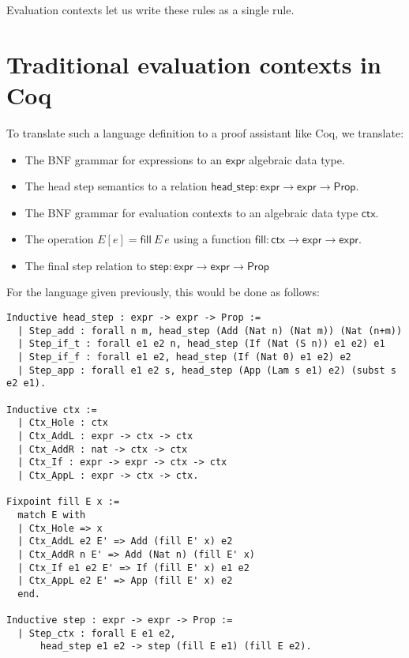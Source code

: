 \documentclass[a4paper, 11pt]{article}
\begin{document}
Evaluation contexts let us write these rules as a single rule.

\section{Traditional evaluation contexts in Coq}

To translate such a language definition to a proof assistant like Coq, we translate:

\begin{itemize}
  \item The BNF grammar for expressions to an $\mathsf{expr}$ algebraic data type.
  \item The head step semantics to a relation $\mathsf{head\_step} : \mathsf{expr} \to \mathsf{expr} \to \mathsf{Prop}$.
  \item The BNF grammar for evaluation contexts to an algebraic data type $\mathsf{ctx}$.
  \item The operation $E[e] = \mathsf{fill}\ E\ e$ using a function $\mathsf{fill} : \mathsf{ctx} \to \mathsf{expr} \to \mathsf{expr}$.
  \item The final step relation to $\mathsf{step} : \mathsf{expr} \to \mathsf{expr} \to \mathsf{Prop}$
\end{itemize}

For the language given previously, this would be done as follows:

\begin{lstlisting}
Inductive head_step : expr -> expr -> Prop :=
  | Step_add : forall n m, head_step (Add (Nat n) (Nat m)) (Nat (n+m))
  | Step_if_t : forall e1 e2 n, head_step (If (Nat (S n)) e1 e2) e1
  | Step_if_f : forall e1 e2, head_step (If (Nat 0) e1 e2) e2
  | Step_app : forall e1 e2 s, head_step (App (Lam s e1) e2) (subst s e2 e1).

Inductive ctx :=
  | Ctx_Hole : ctx
  | Ctx_AddL : expr -> ctx -> ctx
  | Ctx_AddR : nat -> ctx -> ctx
  | Ctx_If : expr -> expr -> ctx -> ctx
  | Ctx_AppL : expr -> ctx -> ctx.

Fixpoint fill E x :=
  match E with
  | Ctx_Hole => x
  | Ctx_AddL e2 E' => Add (fill E' x) e2
  | Ctx_AddR n E' => Add (Nat n) (fill E' x)
  | Ctx_If e1 e2 E' => If (fill E' x) e1 e2
  | Ctx_AppL e2 E' => App (fill E' x) e2
  end.

Inductive step : expr -> expr -> Prop :=
  | Step_ctx : forall E e1 e2,
      head_step e1 e2 -> step (fill E e1) (fill E e2).
\end{lstlisting}
\end{document}
